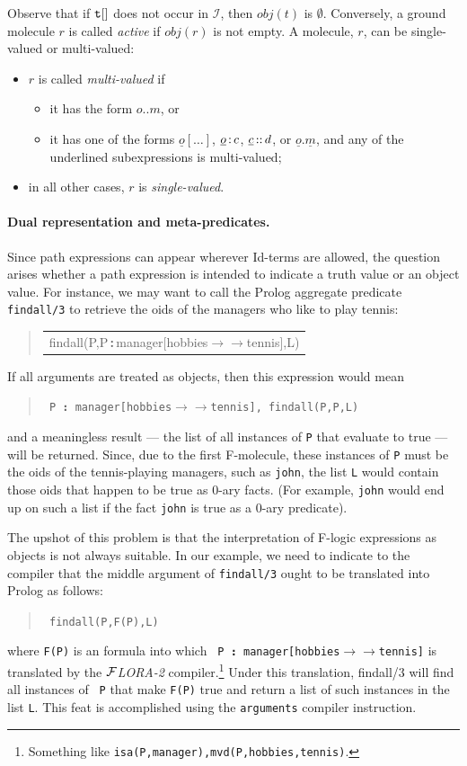 \documentclass[11pt]{article}
\newenvironment{qrules}{\begin{quote}\tt\begin{tabular}[t]{l}}%
{\end{tabular}\end{quote}}
\newcommand{\obj}{\textit{obj}\xspace}
\newcommand{\db}[1]{\ensuremath{\mathcal{#1}}}
\newcommand{\isa}{\,{\bf{:}}\,}
\newcommand{\subcl}{\,{\bf{::}}\,}
\newcommand{\mvd}{\ensuremath{{\rightarrow\!\!\!\!\rightarrow}}}  %
\newcommand{\FLORA}{{\mbox{${\cal F}${\small\it LORA}\rm\emph{-2}}}\xspace}
\newcommand{\fl}{\mbox{F-logic}\xspace}
\begin{document}
Observe that if $\tt t[]$ does not occur in \db{I}, then $\obj(t)$ is
$\emptyset$.  Conversely, a ground molecule $r$ is called \emph{active} if
$\obj(r)$ is not empty. A molecule, $r$, can be 
single-valued or multi-valued:
\begin{itemize}
\item $r$ is called \emph{multi-valued} if
 \begin{itemize}
  \item it has the form $o..m$, or 
  \item it has one of the forms $\underline{o}[\dots]$,
    $\underline{o}\isa c$, $\underline{c}\subcl d$, or
    $\underline{o}.\underline{m}$, and any of the underlined
    subexpressions is multi-valued;
 \end{itemize}
\item in all other cases, $r$ is \emph{single-valued}.
\end{itemize}

\paragraph{Dual representation and meta-predicates.}
Since path expressions can appear wherever Id-terms are allowed, the
question arises whether a path expression is intended to indicate a truth
value or an object value. For instance, we may want to call the Prolog
aggregate predicate {\tt findall/3} to retrieve the oids of the managers
who like to play tennis:
\begin{qrules}
findall(P,P{\isa}manager[hobbies{\mvd}tennis],L)
\end{qrules}
If all arguments are treated as objects, then this expression would mean
\begin{quote}
 \tt
 P{\isa}manager[hobbies{\mvd}tennis], findall(P,P,L)
\end{quote}
and a meaningless result --- the list of all instances of {\tt P} that
evaluate to true --- will be returned. Since, due to the first F-molecule,
these instances of {\tt P} must be the oids of the tennis-playing managers,
such as {\tt john}, the list {\tt L} would contain those oids that happen
to be true as 0-ary facts. (For example, {\tt john} would end up on such a
list if the fact {\tt john} is true as a 0-ary predicate).

The upshot of this problem is that the interpretation of \fl expressions as
objects is not always suitable. In our example, we need to indicate to the
compiler that the middle argument of {\tt findall/3} ought to be translated
into Prolog as follows:
\begin{quote}
 \tt
 findall(P,F(P),L)
\end{quote}
where {\tt F(P)} is an formula into which {\tt
  P{\isa}manager[hobbies{\mvd}tennis]} is translated by the \FLORA
compiler.\footnote{
  Something like {\tt isa(P,manager),mvd(P,hobbies,tennis)}.
  }
Under this translation, findall/3 will find all instances of {\tt
  P} that make {\tt F(P)} true and return a list of such instances in the
list {\tt L}. This feat is accomplished using the {\tt arguments} compiler
instruction.
\end{document}
